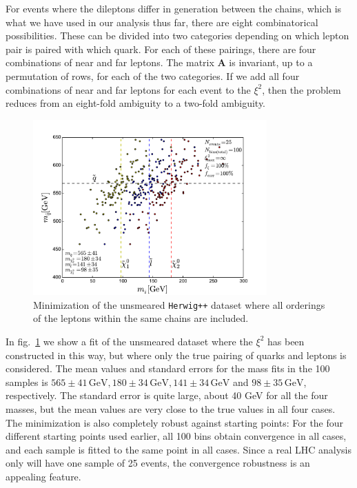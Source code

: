 \documentclass[twoside,english]{uiofysmaster}
\begin{document}
For events where the dileptons differ in generation between the chains, which is what we have used in our analysis thus far, there are eight combinatorical possibilities. These can be divided into two categories depending on which lepton pair is paired with which quark. For each of these pairings, there are four combinations of near and far leptons. The matrix $\mathbf{A}$ is invariant, up to a permutation of rows, for each of the two categories. If we add all four combinations of near and far leptons for each event to the $\xi^2$, then the problem reduces from an eight-fold ambiguity to a two-fold ambiguity. 
\begin{figure}[hbt]
	\centering
	\includegraphics[width=0.8\textwidth]{figures/improving_combinatorics/herwigpp-4combosum-fit-nocomb-nosmear-nocut.pdf} 
	\caption{Minimization of the unsmeared {\tt Herwig++} dataset where all orderings of the leptons within the same chains are included.}
	\label{fig:4combosum_nocomb-nosmear}
\end{figure}
In fig.\ \ref{fig:4combosum_nocomb-nosmear} we show a fit of the unsmeared dataset where the $\xi^2$ has been constructed in this way, but where only the true pairing of quarks and leptons is considered. The mean values and standard errors for the mass fits in the 100 samples is $565 \pm 41\, \mathrm{GeV}, 180 \pm 34\, \mathrm{GeV}, 141 \pm 34\, \mathrm{GeV}$ and $98 \pm 35\, \mathrm{GeV}$, respectively. The standard error is quite large, about 40 GeV for all the four masses, but the mean values are very close to the true values in all four cases. The minimization is also completely robust against starting points: For the four different starting points used earlier, all 100 bins obtain convergence in all cases, and each sample is fitted to the same point in all cases. Since a real LHC analysis only will have one sample of 25 events, the convergence robustness is an appealing feature. 
\end{document}
